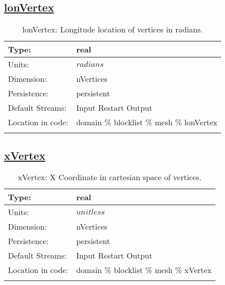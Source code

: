 \subsection[lonVertex]{\hyperref[sec:var_tab_mesh]{lonVertex}}
\label{subsec:var_sec_mesh_lonVertex}
\begin{center}
\begin{longtable}{| p{2.0in} | p{4.0in} |}
        \hline 
        Type: & real \\
        \hline 
        Units: & $radians$ \\
        \hline 
        Dimension: & nVertices \\
        \hline 
        Persistence: & persistent \\
        \hline 
		 Default Streams: & Input Restart Output  \\
        \hline 
		 Location in code: & domain \% blocklist \% mesh \% lonVertex \\
		 \hline 
    \caption{lonVertex: Longitude location of vertices in radians.}
\end{longtable}
\end{center}
\subsection[xVertex]{\hyperref[sec:var_tab_mesh]{xVertex}}
\label{subsec:var_sec_mesh_xVertex}
\begin{center}
\begin{longtable}{| p{2.0in} | p{4.0in} |}
        \hline 
        Type: & real \\
        \hline 
        Units: & $unitless$ \\
        \hline 
        Dimension: & nVertices \\
        \hline 
        Persistence: & persistent \\
        \hline 
		 Default Streams: & Input Restart Output  \\
        \hline 
		 Location in code: & domain \% blocklist \% mesh \% xVertex \\
		 \hline 
    \caption{xVertex: X Coordinate in cartesian space of vertices.}
\end{longtable}
\end{center}
